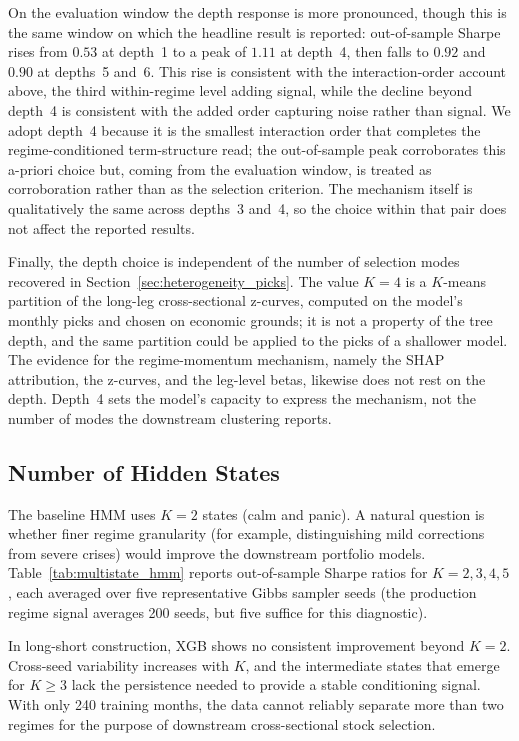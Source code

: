 On the evaluation window the depth response is more pronounced, though this is the same window on which the headline result is reported: out-of-sample Sharpe rises from $0.53$ at depth~1 to a peak of $1.11$ at depth~4, then falls to $0.92$ and $0.90$ at depths~5 and~6. This rise is consistent with the interaction-order account above, the third within-regime level adding signal, while the decline beyond depth~4 is consistent with the added order capturing noise rather than signal. We adopt depth~4 because it is the smallest interaction order that completes the regime-conditioned term-structure read; the out-of-sample peak corroborates this a-priori choice but, coming from the evaluation window, is treated as corroboration rather than as the selection criterion. The mechanism itself is qualitatively the same across depths~3 and~4, so the choice within that pair does not affect the reported results.

Finally, the depth choice is independent of the number of selection modes recovered in Section~\ref{sec:heterogeneity_picks}. The value $K=4$ is a $K$-means partition of the long-leg cross-sectional z-curves, computed on the model's monthly picks and chosen on economic grounds; it is not a property of the tree depth, and the same partition could be applied to the picks of a shallower model. The evidence for the regime-momentum mechanism, namely the SHAP attribution, the z-curves, and the leg-level betas, likewise does not rest on the depth. Depth~4 sets the model's capacity to express the mechanism, not the number of modes the downstream clustering reports.

\subsection{Number of Hidden States}\label{app:num_states}

The baseline HMM uses $K = 2$ states (calm and panic). A natural question is whether finer regime granularity (for example, distinguishing mild corrections from severe crises) would improve the downstream portfolio models. Table~\ref{tab:multistate_hmm} reports out-of-sample Sharpe ratios for $K = 2, 3, 4, 5$, each averaged over five representative Gibbs sampler seeds (the production regime signal averages 200 seeds, but five suffice for this diagnostic).



In long-short construction, XGB shows no consistent improvement beyond $K = 2$. Cross-seed variability increases with $K$, and the intermediate states that emerge for $K \geq 3$ lack the persistence needed to provide a stable conditioning signal. With only 240 training months, the data cannot reliably separate more than two regimes for the purpose of downstream cross-sectional stock selection.

